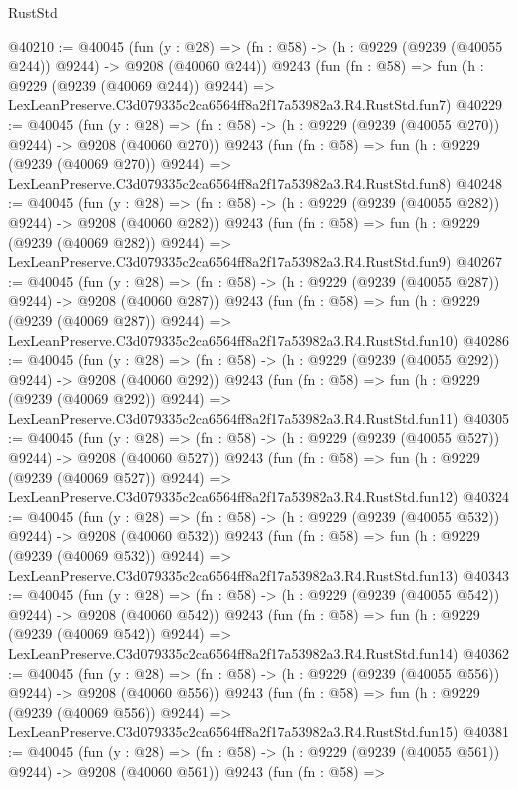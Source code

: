 \begin{lexlean}{RustStd}
\begin{coremodule}
@40210 := @40045
    (fun (y : @28) => (fn : @58) -> (h : @9229 (@9239 (@40055 @244)) @9244) -> @9208 (@40060 @244))
    @9243
    (fun (fn : @58) =>
    fun (h : @9229 (@9239 (@40069 @244)) @9244) =>
    LexLeanPreserve.C3d079335c2ca6564ff8a2f17a53982a3.R4.RustStd.fun7)
@40229 := @40045
    (fun (y : @28) => (fn : @58) -> (h : @9229 (@9239 (@40055 @270)) @9244) -> @9208 (@40060 @270))
    @9243
    (fun (fn : @58) =>
    fun (h : @9229 (@9239 (@40069 @270)) @9244) =>
    LexLeanPreserve.C3d079335c2ca6564ff8a2f17a53982a3.R4.RustStd.fun8)
@40248 := @40045
    (fun (y : @28) => (fn : @58) -> (h : @9229 (@9239 (@40055 @282)) @9244) -> @9208 (@40060 @282))
    @9243
    (fun (fn : @58) =>
    fun (h : @9229 (@9239 (@40069 @282)) @9244) =>
    LexLeanPreserve.C3d079335c2ca6564ff8a2f17a53982a3.R4.RustStd.fun9)
@40267 := @40045
    (fun (y : @28) => (fn : @58) -> (h : @9229 (@9239 (@40055 @287)) @9244) -> @9208 (@40060 @287))
    @9243
    (fun (fn : @58) =>
    fun (h : @9229 (@9239 (@40069 @287)) @9244) =>
    LexLeanPreserve.C3d079335c2ca6564ff8a2f17a53982a3.R4.RustStd.fun10)
@40286 := @40045
    (fun (y : @28) => (fn : @58) -> (h : @9229 (@9239 (@40055 @292)) @9244) -> @9208 (@40060 @292))
    @9243
    (fun (fn : @58) =>
    fun (h : @9229 (@9239 (@40069 @292)) @9244) =>
    LexLeanPreserve.C3d079335c2ca6564ff8a2f17a53982a3.R4.RustStd.fun11)
@40305 := @40045
    (fun (y : @28) => (fn : @58) -> (h : @9229 (@9239 (@40055 @527)) @9244) -> @9208 (@40060 @527))
    @9243
    (fun (fn : @58) =>
    fun (h : @9229 (@9239 (@40069 @527)) @9244) =>
    LexLeanPreserve.C3d079335c2ca6564ff8a2f17a53982a3.R4.RustStd.fun12)
@40324 := @40045
    (fun (y : @28) => (fn : @58) -> (h : @9229 (@9239 (@40055 @532)) @9244) -> @9208 (@40060 @532))
    @9243
    (fun (fn : @58) =>
    fun (h : @9229 (@9239 (@40069 @532)) @9244) =>
    LexLeanPreserve.C3d079335c2ca6564ff8a2f17a53982a3.R4.RustStd.fun13)
@40343 := @40045
    (fun (y : @28) => (fn : @58) -> (h : @9229 (@9239 (@40055 @542)) @9244) -> @9208 (@40060 @542))
    @9243
    (fun (fn : @58) =>
    fun (h : @9229 (@9239 (@40069 @542)) @9244) =>
    LexLeanPreserve.C3d079335c2ca6564ff8a2f17a53982a3.R4.RustStd.fun14)
@40362 := @40045
    (fun (y : @28) => (fn : @58) -> (h : @9229 (@9239 (@40055 @556)) @9244) -> @9208 (@40060 @556))
    @9243
    (fun (fn : @58) =>
    fun (h : @9229 (@9239 (@40069 @556)) @9244) =>
    LexLeanPreserve.C3d079335c2ca6564ff8a2f17a53982a3.R4.RustStd.fun15)
@40381 := @40045
    (fun (y : @28) => (fn : @58) -> (h : @9229 (@9239 (@40055 @561)) @9244) -> @9208 (@40060 @561))
    @9243
    (fun (fn : @58) =>

\end{coremodule}
\end{lexlean}
